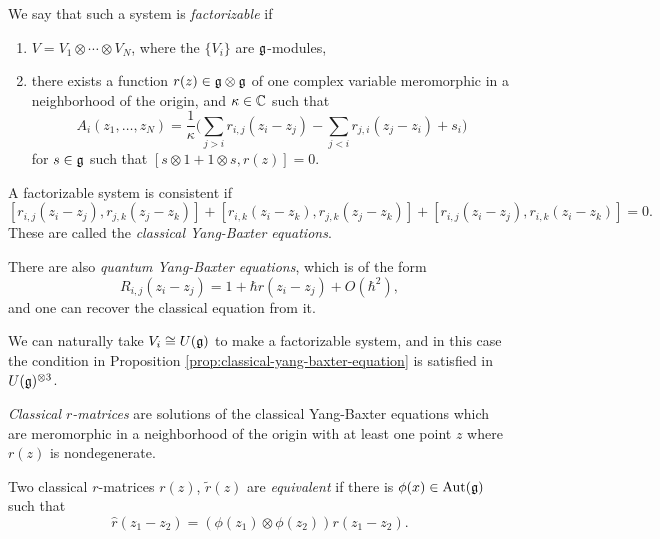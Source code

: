 \begin{definition}
  We say that such a system is
  \emph{factorizable} if
  \begin{enumerate}
    \item $V = V_1 \otimes \cdots \otimes V_N$,
      where the $\{V_i\}$ are $\mathfrak{g}$-modules,
    \item there exists a function
      $r(z) \in \mathfrak{g} \otimes \mathfrak{g}$ of one
      complex variable meromorphic
      in a neighborhood of the origin,
      and $\kappa \in \mathbb{C}$ such that
      \[
        A_i(z_1, \dots, z_N)
        = \frac{1}{\kappa}
        \bigg(
          \sum_{j > i} r_{i, j}(z_i - z_j)
          - \sum_{j < i} r_{j, i}(z_j - z_i)
          + s_i
        \bigg)
      \]
      for $s \in \mathfrak{g}$ such that
      $[s \otimes 1 + 1 \otimes s, r(z)] = 0$.
  \end{enumerate}
\end{definition}

\begin{prop}\label{prop:classical-yang-baxter-equation}
  A factorizable system is consistent
  if
  \[
    [r_{i, j}(z_i - z_j), r_{j, k}(z_j - z_k)]
    + [r_{i, k}(z_i - z_k), r_{j, k}(z_j - z_k)]
    + [r_{i, j}(z_i - z_j), r_{i, k}(z_i - z_k)] = 0.
  \]
  These are called the
  \emph{classical Yang-Baxter equations}.
\end{prop}

\begin{remark}
  There are also
  \emph{quantum Yang-Baxter equations}, which
  is of the form
  \[
    R_{i, j}(z_i - z_j)
    = 1 + \hbar r(z_i - z_j) + O(\hbar^2),
  \]
  and one can recover the
  classical equation from it.
\end{remark}

\begin{remark}
  We can naturally take $V_i \cong U(\mathfrak{g})$
  to make a factorizable system, and in
  this case the
  condition in Proposition
  \ref{prop:classical-yang-baxter-equation} is
  satisfied in $U(\mathfrak{g})^{\otimes 3}$.
\end{remark}

\begin{definition}
  \emph{Classical $r$-matrices} are
  solutions of the classical Yang-Baxter
  equations which are meromorphic in a
  neighborhood of the origin
  with at least one point
  $z$ where $r(z)$ is nondegenerate.
\end{definition}

\begin{definition}
  Two classical $r$-matrices
  $r(z)$, $\widetilde{r}(z)$ are
  \emph{equivalent} if there is
  $\phi(x) \in \operatorname{Aut}(\mathfrak{g})$ such that
  \[
    \widehat{r}(z_1 - z_2)
    = (\phi(z_1) \otimes \phi(z_2)) r(z_1 - z_2).
  \]
\end{definition}

